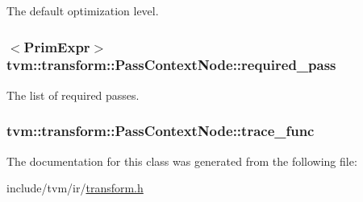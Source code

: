 The default optimization level. 

\subsubsection[{\texorpdfstring{required\+\_\+pass}{required_pass}}]{$<${\bf Prim\+Expr}$>$ tvm\+::transform\+::\+Pass\+Context\+Node\+::required\+\_\+pass}\hypertarget{classtvm_1_1transform_1_1PassContextNode_ac8928bc4c5bfe3a1b2c7805da35f707a}{}\label{classtvm_1_1transform_1_1PassContextNode_ac8928bc4c5bfe3a1b2c7805da35f707a}


The list of required passes. 

\subsubsection[{\texorpdfstring{trace\+\_\+func}{trace_func}}]{ tvm\+::transform\+::\+Pass\+Context\+Node\+::trace\+\_\+func}\hypertarget{classtvm_1_1transform_1_1PassContextNode_a84242480dd92b11637881d8313524481}{}\label{classtvm_1_1transform_1_1PassContextNode_a84242480dd92b11637881d8313524481}


The documentation for this class was generated from the following file\+:\begin{DoxyCompactItemize}
\item 
include/tvm/ir/\hyperlink{include_2tvm_2ir_2transform_8h}{transform.\+h}\end{DoxyCompactItemize}

